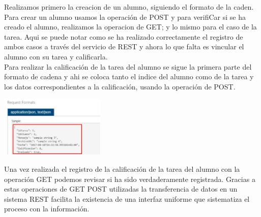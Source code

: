Realizamos primero la creacion de un alumno, siguiendo el formato de la caden. Para crear un alumno usamos la operación de POST y para verifiCar si se ha creado el alumno, realizamos la operacion de GET; y lo mismo para el caso de la tarea.
Aqui se puede notar como se ha realizado correctamente el registro de ambos casos a través del servicio de REST y ahora lo que falta es vincular el alumno con su tarea y calificarla.
\\ Para realizar la calificación de la tarea del alumno se sigue la primera parte del formato de cadena y ahi se coloca tanto el indice del alumno como de la tarea y los datos correspondientes a la calificación, usando la operación de POST.
\begin{center}
\includegraphics[width=5cm]{./Imagenes/analisis3}
\end{center}
Una vez realizada el registro de la calificación de la tarea del alumno con la operación GET podemos revisar si ha sido verdaderamente registrada. Gracias a estas operaciones de GET POST utilizadas la transferencia de datos en un sistema REST facilita la existencia de una interfaz uniforme que sistematiza el proceso con la información.